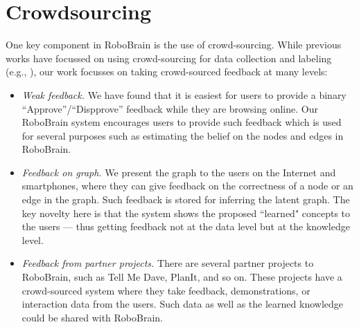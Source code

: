 
\section{Crowdsourcing}

One key component in RoboBrain is the use of crowd-sourcing.   While 
previous works have focussed on using crowd-sourcing for data collection and
labeling (e.g., \cite{blah,blah2}), our work focusses on taking crowd-sourced
feedback at many levels:
\begin{itemize}

\item \emph{Weak feedback.}  We have found that it is easiest for users
to provide a binary ``Approve''/``Dispprove'' feedback while they are browsing
online. Our RoboBrain system encourages users to provide such feedback
which is used for  several purposes such as estimating the belief on the nodes
and edges in RoboBrain.


\item \emph{Feedback on graph.}  We present the graph to the users on the Internet
and smartphones, where they can give feedback on the correctness of a node
or an edge in the graph.  Such feedback is stored for inferring the latent graph.
The key novelty here is that the system shows the proposed ``learned" concepts to the 
users --- thus getting feedback not at the data level but at the knowledge level.


\item  \emph{Feedback from partner projects.}   There are several partner 
projects to RoboBrain, such as Tell Me Dave, PlanIt, and so on.  These projects
have a crowd-sourced system where they take feedback, demonstrations,
or interaction data from the users. Such data as well as the learned knowledge 
could be shared with RoboBrain.


\end{itemize}
